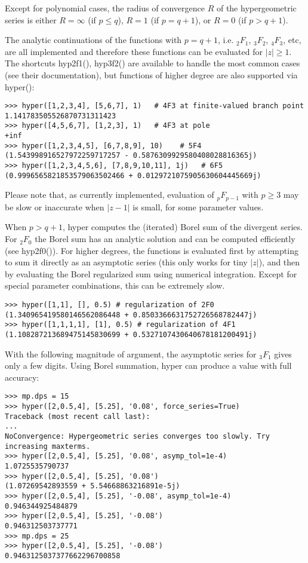 Except for polynomial cases, the radius of convergence $R$ of the hypergeometric series is either $R=\infty$ (if $p \leq q$), $R=1$ (if $p=q+1$), or $R=0$ (if $p>q+1$).

The analytic continuations of the functions with $p=q+1$, i.e. ${}_2F_1$, ${}_3F_2$, ${}_4F_3$, etc, are all implemented and therefore these functions can be evaluated for $|z|\geq 1$. The shortcuts hyp2f1(), hyp3f2() are available to handle the most common cases (see their documentation), but functions of higher degree are also supported via hyper():

\begin{lstlisting}
>>> hyper([1,2,3,4], [5,6,7], 1)   # 4F3 at finite-valued branch point
1.141783505526870731311423
>>> hyper([4,5,6,7], [1,2,3], 1)   # 4F3 at pole
+inf
>>> hyper([1,2,3,4,5], [6,7,8,9], 10)    # 5F4
(1.543998916527972259717257 - 0.5876309929580408028816365j)
>>> hyper([1,2,3,4,5,6], [7,8,9,10,11], 1j)   # 6F5
(0.9996565821853579063502466 + 0.0129721075905630604445669j)
\end{lstlisting}

Please note that, as currently implemented, evaluation of ${}_pF_{p-1}$  with $p \geq 3$ may be slow or inaccurate when $|z-1|$ is small, for some parameter values.

When $p>q+1$, hyper computes the (iterated) Borel sum of the divergent series. For ${}_2F_0$ the Borel sum has an analytic solution and can be computed efficiently (see hyp2f0()). For higher degrees, the functions is evaluated first by attempting to sum it directly as an asymptotic series (this only works for tiny $|z|$), and then by evaluating the
Borel regularized sum using numerical integration. Except for special parameter combinations, this can be extremely slow.

\begin{lstlisting}
>>> hyper([1,1], [], 0.5) # regularization of 2F0
(1.340965419580146562086448 + 0.8503366631752726568782447j)
>>> hyper([1,1,1,1], [1], 0.5) # regularization of 4F1
(1.108287213689475145830699 + 0.5327107430640678181200491j)
\end{lstlisting}

With the following magnitude of argument, the asymptotic series for ${}_3F_1$ gives only a few digits. Using Borel summation, hyper can produce a value with full accuracy:

\begin{lstlisting}
>>> mp.dps = 15
>>> hyper([2,0.5,4], [5.25], '0.08', force_series=True)
Traceback (most recent call last):
...
NoConvergence: Hypergeometric series converges too slowly. Try increasing maxterms.
>>> hyper([2,0.5,4], [5.25], '0.08', asymp_tol=1e-4)
1.0725535790737
>>> hyper([2,0.5,4], [5.25], '0.08')
(1.07269542893559 + 5.54668863216891e-5j)
>>> hyper([2,0.5,4], [5.25], '-0.08', asymp_tol=1e-4)
0.946344925484879
>>> hyper([2,0.5,4], [5.25], '-0.08')
0.946312503737771
>>> mp.dps = 25
>>> hyper([2,0.5,4], [5.25], '-0.08')
0.9463125037377662296700858
\end{lstlisting}

